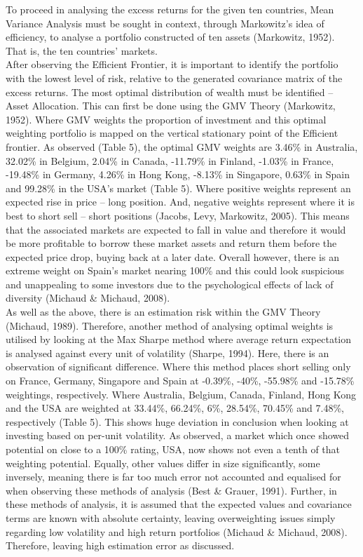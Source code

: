 \documentclass[11pt, english]{article}
\begin{document}
	To proceed in analysing the excess returns for the given ten countries, Mean Variance Analysis must be sought in context, through Markowitz's idea of efficiency, to analyse a portfolio constructed of ten assets (Markowitz, 1952). That is, the ten countries' markets.\\

	After observing the Efficient Frontier, it is important to identify the portfolio with the lowest level of risk, relative to the generated covariance matrix of the excess returns. The most optimal distribution of wealth must be identified – Asset Allocation. This can first be done using the GMV Theory (Markowitz, 1952). Where GMV weights the proportion of investment and this optimal weighting portfolio is mapped on the vertical stationary point of the Efficient frontier. As observed (Table 5), the optimal GMV weights are 3.46\% in Australia, 32.02\% in Belgium, 2.04\% in Canada, -11.79\% in Finland, -1.03\% in France, -19.48\% in Germany, 4.26\% in Hong Kong, -8.13\% in Singapore, 0.63\% in Spain and 99.28\% in the USA's market (Table 5). Where positive weights represent an expected rise in price – long position. And, negative weights represent where it is best to short sell – short positions (Jacobs, Levy, Markowitz, 2005). This means that the associated markets are expected to fall in value and therefore it would be more profitable to borrow these market assets and return them before the expected price drop, buying back at a later date. Overall however, there is an extreme weight on Spain's market nearing 100\% and this could look suspicious and unappealing to some investors due to the psychological effects of lack of diversity (Michaud \& Michaud, 2008).\\

	As well as the above, there is an estimation risk within the GMV Theory (Michaud, 1989). Therefore, another method of analysing optimal weights is utilised by looking at the Max Sharpe method where average return expectation is analysed against every unit of volatility (Sharpe, 1994). Here, there is an observation of significant difference. Where this method places short selling only on France, Germany, Singapore and Spain at -0.39\%, -40\%, -55.98\% and -15.78\% weightings, respectively. Where Australia, Belgium, Canada, Finland, Hong Kong and the USA are weighted at 33.44\%, 66.24\%, 6\%, 28.54\%, 70.45\% and 7.48\%, respectively (Table 5). This shows huge deviation in conclusion when looking at investing based on per-unit volatility. As observed, a market which once showed potential on close to a 100\% rating, USA, now shows not even a tenth of that weighting potential. Equally, other values differ in size significantly, some inversely, meaning there is far too much error not accounted and equalised for when observing these methods of analysis (Best \& Grauer, 1991). Further, in these methods of analysis, it is assumed that the expected values and covariance terms are known with absolute certainty, leaving overweighting issues simply regarding low volatility and high return portfolios (Michaud \& Michaud, 2008). Therefore, leaving high estimation error as discussed.
\end{document}
